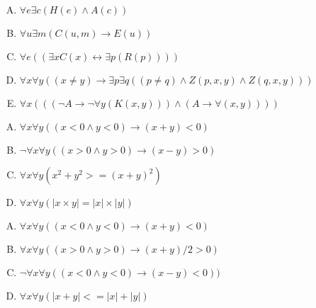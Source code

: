 {{        %
        \begin{practices}
            \begin{enumerate}[A.]
                \item $\forall e \exists c (H(e) \wedge A(c))$
                \item $\forall u \exists m (C(u, m) \rightarrow E(u))$
                \item $\forall e ((\exists x C(x) \leftrightarrow \exists p (R(p))))$
                \item $\forall x \forall y ((x \neq y) \rightarrow \exists p \exists q ((p \neq q) \wedge Z(p, x, y) \wedge Z(q, x, y)))$
                \item $\forall x (((\neg A \rightarrow \neg \forall y (K(x, y))) \wedge (A \rightarrow \forall (x, y))))$
            \end{enumerate}
        \end{practices}

        \begin{practices}
            \begin{enumerate}[A.]
                \item $\forall x \forall y ((x < 0 \wedge y < 0) \rightarrow (x + y) < 0)$
                \item $\neg \forall x \forall y ((x > 0 \wedge y > 0) \rightarrow (x - y) > 0)$
                \item $\forall x \forall y (x^2 + y^2 >= (x + y)^2)$
                \item $\forall x \forall y (|x \times y| = |x| \times |y|)$
            \end{enumerate}
        \end{practices}

        \begin{practices}
            \begin{enumerate}[A.]
                \item $\forall x \forall y ((x < 0 \wedge y < 0) \rightarrow (x + y) < 0)$
                \item $\forall x \forall y ((x > 0 \wedge y > 0) \rightarrow (x + y) / 2 > 0)$
                \item $\neg \forall x \forall y ((x < 0 \wedge y < 0) \rightarrow (x - y) < 0))$
                \item $\forall x \forall y (|x + y| <= |x| + |y|)$
            \end{enumerate}
        \end{practices}

}}
